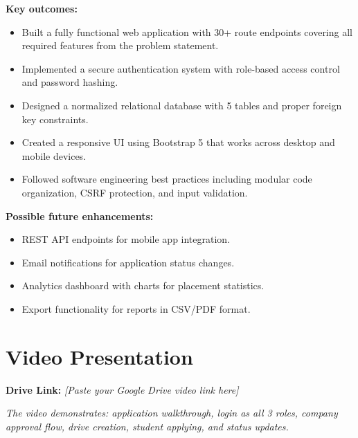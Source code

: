\documentclass[12pt,a4paper]{article}
\begin{document}
\textbf{Key outcomes:}
\begin{itemize}[leftmargin=*]
    \item Built a fully functional web application with 30+ route endpoints covering
          all required features from the problem statement.
    \item Implemented a secure authentication system with role-based access control
          and password hashing.
    \item Designed a normalized relational database with 5 tables and proper foreign
          key constraints.
    \item Created a responsive UI using Bootstrap 5 that works across desktop and
          mobile devices.
    \item Followed software engineering best practices including modular code organization,
          CSRF protection, and input validation.
\end{itemize}

\textbf{Possible future enhancements:}
\begin{itemize}[leftmargin=*]
    \item REST API endpoints for mobile app integration.
    \item Email notifications for application status changes.
    \item Analytics dashboard with charts for placement statistics.
    \item Export functionality for reports in CSV/PDF format.
\end{itemize}

\section{Video Presentation}

\textbf{Drive Link:} \textit{[Paste your Google Drive video link here]}

\vspace{6pt}
\textit{The video demonstrates: application walkthrough, login as all 3 roles,
company approval flow, drive creation, student applying, and status updates.}

\end{document}
